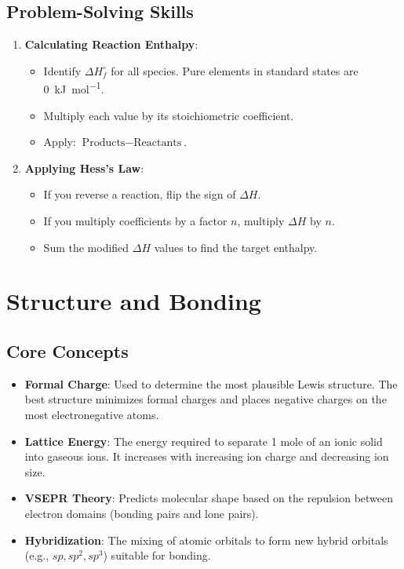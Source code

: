 \documentclass[11pt]{article}
\begin{document}
\subsection{Problem-Solving Skills}
\begin{enumerate}
    \item \textbf{Calculating Reaction Enthalpy}:
        \begin{itemize}
            \item Identify $\Delta H_f^\circ$ for all species. Pure elements in standard states are \SI{0}{\kilo\joule\per\mole}.
            \item Multiply each value by its stoichiometric coefficient.
            \item Apply: $\text{Products} - \text{Reactants}$.
        \end{itemize}
    \item \textbf{Applying Hess's Law}:
        \begin{itemize}
            \item If you reverse a reaction, flip the sign of $\Delta H$.
            \item If you multiply coefficients by a factor $n$, multiply $\Delta H$ by $n$.
            \item Sum the modified $\Delta H$ values to find the target enthalpy.
        \end{itemize}
\end{enumerate}

\newpage

\section{Structure and Bonding}

\subsection{Core Concepts}
\begin{itemize}
    \item \textbf{Formal Charge}: Used to determine the most plausible Lewis structure. The best structure minimizes formal charges and places negative charges on the most electronegative atoms.
    \item \textbf{Lattice Energy}: The energy required to separate 1 mole of an ionic solid into gaseous ions. It increases with increasing ion charge and decreasing ion size.
    \item \textbf{VSEPR Theory}: Predicts molecular shape based on the repulsion between electron domains (bonding pairs and lone pairs).
    \item \textbf{Hybridization}: The mixing of atomic orbitals to form new hybrid orbitals (e.g., $sp, sp^2, sp^3$) suitable for bonding.
\end{itemize}
\end{document}
